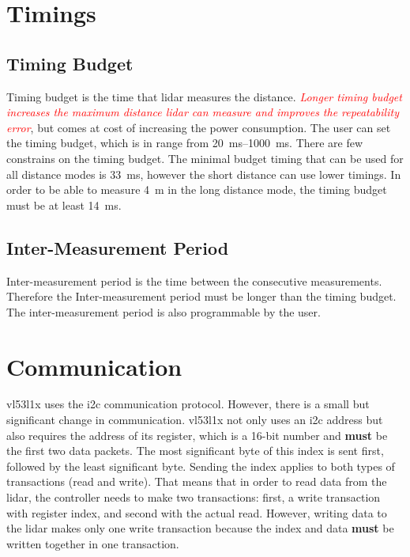 \documentclass[
  digital,     %
  oneside,     %
  nosansbold,  %
  nocolorbold, %
  lof,         %
  lot,         %
]{fithesis4}
\newcommand{\TODO}[1]{\textcolor{red}{\textit{#1}}}
\begin{document}
\section{ Timings }

\subsection{ Timing Budget } \label{TB}

Timing budget is the time that \acrshort{lidar} measures the distance. \TODO{ Longer timing budget increases the maximum distance \acrshort{lidar} can measure and improves the repeatability error}, but comes at cost of increasing the power consumption. The user can set the timing budget, which is in range from \qtyrange{20}{1000}{\milli\second}. There are few constrains on the timing budget. The minimal budget timing that can be used for all distance modes is \qty{33}{\milli\second}, however the short distance can use lower timings. In order to be able to measure \qty{4}{\metre} in the long distance mode, the timing budget must be at least \qty{14}{\milli\second}.

\subsection{ Inter-Measurement Period }
Inter-measurement period is the time between the consecutive measurements. Therefore the Inter-measurement period must be longer than the timing budget. The inter-measurement period is also programmable by the user.

\section{ Communication }
\gls{vl53l1x} uses the \acrshort{i2c} communication protocol. However, there is a small but significant change in communication. \gls{vl53l1x} not only uses an \acrshort{i2c} address but also requires the address of its register, which is a 16-bit number and \textbf{must} be the first two data packets. The most significant byte of this index is sent first, followed by the least significant byte. Sending the index applies to both types of transactions (read and write). That means that in order to read data from the \acrshort{lidar}, the controller needs to make two transactions: first, a write transaction with register index, and second with the actual read. However, writing data to the \acrshort{lidar} makes only one write transaction because the index and data \textbf{must} be written together in one transaction.
\end{document}
